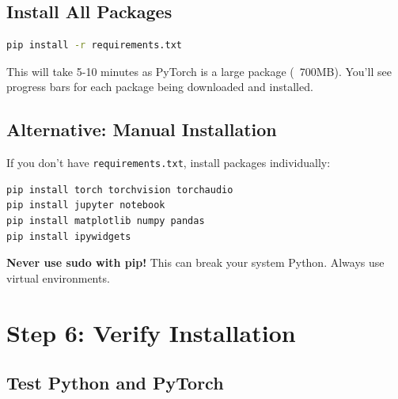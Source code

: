 \documentclass[11pt,a4paper]{article}
\begin{document}
\subsection{Install All Packages}

\begin{lstlisting}[language=bash]
pip install -r requirements.txt
\end{lstlisting}

\begin{infobox}
This will take 5-10 minutes as PyTorch is a large package (~700MB). You'll see progress bars for each package being downloaded and installed.
\end{infobox}

\subsection{Alternative: Manual Installation}

If you don't have \texttt{requirements.txt}, install packages individually:

\begin{lstlisting}[language=bash]
pip install torch torchvision torchaudio
pip install jupyter notebook
pip install matplotlib numpy pandas
pip install ipywidgets
\end{lstlisting}

\begin{warningbox}
\textbf{Never use sudo with pip!} This can break your system Python. Always use virtual environments.
\end{warningbox}

\section{Step 6: Verify Installation}

\subsection{Test Python and PyTorch}
\end{document}
